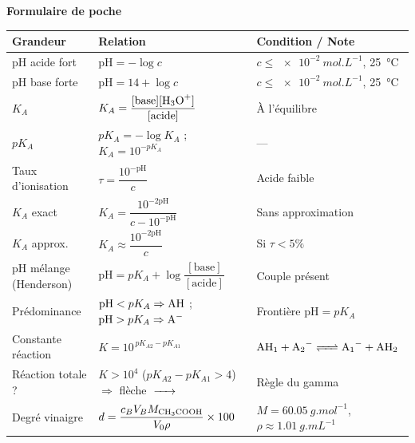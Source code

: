 \documentclass[11pt]{article}
\begin{document}
\begin{bilan}
\textbf{Formulaire de poche}
\begin{center}
\begin{tabularx}{\linewidth}{|l|X|X|}
\hline
\rowcolor{popblueL} \textbf{Grandeur} & \textbf{Relation} & \textbf{Condition / Note} \\
\hline
pH acide fort & $\text{pH} = -\log c$ & $c \le \SI{e-2}{mol.L^{-1}}$, \SI{25}{\celsius} \\
\hline
pH base forte & $\text{pH} = 14 + \log c$ & $c \le \SI{e-2}{mol.L^{-1}}$, \SI{25}{\celsius} \\
\hline
$K_A$ & $K_A = \dfrac{[\text{base}][\ce{H3O+}]}{[\text{acide}]}$ & À l'équilibre \\
\hline
$pK_A$ & $pK_A = -\log K_A$ ; $K_A = 10^{-pK_A}$ & --- \\
\hline
Taux d'ionisation & $\tau = \dfrac{10^{-\text{pH}}}{c}$ & Acide faible \\
\hline
$K_A$ exact & $K_A = \dfrac{10^{-2\text{pH}}}{c - 10^{-\text{pH}}}$ & Sans approximation \\
\hline
$K_A$ approx. & $K_A \approx \dfrac{10^{-2\text{pH}}}{c}$ & Si $\tau < 5\%$ \\
\hline
pH mélange (Henderson) & $\text{pH} = pK_A + \log \dfrac{[\text{base}]}{[\text{acide}]}$ & Couple présent \\
\hline
Prédominance & $\text{pH} < pK_A \Rightarrow \ce{AH}$ ; $\text{pH} > pK_A \Rightarrow \ce{A-}$ & Frontière $\text{pH}=pK_A$ \\
\hline
Constante réaction & $K = 10^{\,pK_{A2} - pK_{A1}}$ & $\ce{AH1 + A2- <=> A1- + AH2}$ \\
\hline
Réaction totale ? & $K > 10^4$ ($pK_{A2}-pK_{A1} > 4$) $\Rightarrow$ flèche $\ce{->}$ & Règle du gamma \\
\hline
Degré vinaigre & $d = \dfrac{c_B V_B M_{\ce{CH3COOH}}}{V_0 \rho} \times 100$ & $M=\SI{60,05}{g.mol^{-1}}$, $\rho\approx\SI{1,01}{g.mL^{-1}}$ \\
\hline
\end{tabularx}
\end{center}


\end{bilan}
\end{document}
